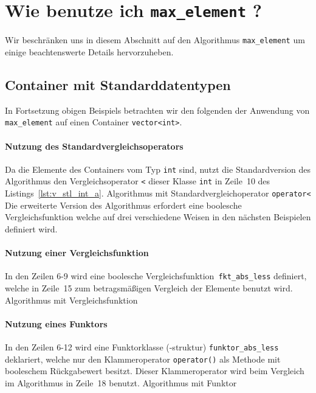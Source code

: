 \section{Wie benutze ich \texttt{max\_element} ?}
\label{p:11.2}
Wir beschränken uns in diesem Abschnitt auf den Algorithmus \verb|max_element| um einige beachtenswerte Details 
hervorzuheben. 
%
\subsection{Container mit Standarddatentypen}
\label{p:11.2.1}
In Fortsetzung obigen Beispiels betrachten wir den folgenden 
der Anwendung von \verb|max_element| auf
einen Container \verb|vector<int>|.

%
\paragraph{Nutzung des Standardvergleichsoperators} 
\label{p:11.2.1.1}
%
Da die Elemente des Containers vom Typ \verb|int| sind, nutzt die 
Standardversion des Algorithmus den Vergleichsoperator \verb|<| dieser
Klasse \verb|int| in Zeile~10 des Listings~\ref{lst:v_stl_int_a}.
%
{Algorithmus mit Standardvergleichoperator \texttt{operator<}}
%
Die erweiterte Version des Algorithmus erfordert eine boolesche Vergleichsfunktion welche auf 
drei verschiedene Weisen in den nächsten Beispielen definiert wird.
%
\paragraph{Nutzung einer Vergleichsfunktion} 
\label{p:11.2.1.2}
%
In den Zeilen 6-9 wird eine boolesche Vergleichsfunktion~\texttt{fkt\_abs\_less} definiert, welche in Zeile~15 
zum betragsmäßigen Vergleich der Elemente benutzt wird. 
%
{Algorithmus mit Vergleichsfunktion}
%

\paragraph{Nutzung eines Funktors} 
\label{p:11.2.1.3}
%
In den Zeilen 6-12 wird eine Funktorklasse (-struktur) \texttt{funktor\_abs\_less} 
deklariert, welche nur den Klammeroperator \verb|operator()| als Methode mit booleschem Rückgabewert besitzt.
Dieser Klammeroperator wird beim Vergleich im Algorithmus in Zeile~18 benutzt.
%
{Algorithmus mit Funktor}
%

